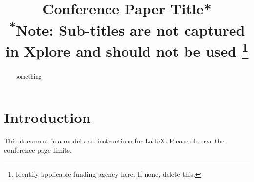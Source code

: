 \documentclass[conference]{IEEEtran}
\begin{document}
\title{Conference Paper Title*\\
{\footnotesize \textsuperscript{*}Note: Sub-titles are not captured in Xplore and
should not be used}
\thanks{Identify applicable funding agency here. If none, delete this.}
}

\author{
\and
{}
}

\maketitle

\begin{abstract}
something
\end{abstract}


\section{Introduction}
This document is a model and instructions for \LaTeX.
Please observe the conference page limits. 
\end{document}

